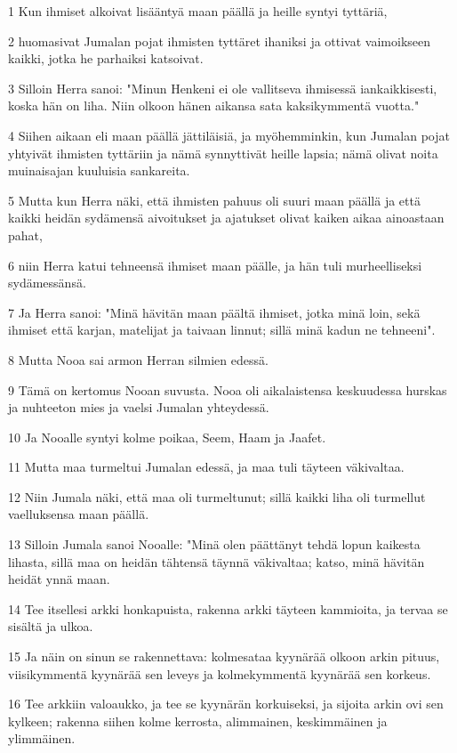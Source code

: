 \par 1 Kun ihmiset alkoivat lisääntyä maan päällä ja heille syntyi tyttäriä,
\par 2 huomasivat Jumalan pojat ihmisten tyttäret ihaniksi ja ottivat vaimoikseen kaikki, jotka he parhaiksi katsoivat.
\par 3 Silloin Herra sanoi: "Minun Henkeni ei ole vallitseva ihmisessä iankaikkisesti, koska hän on liha. Niin olkoon hänen aikansa sata kaksikymmentä vuotta."
\par 4 Siihen aikaan eli maan päällä jättiläisiä, ja myöhemminkin, kun Jumalan pojat yhtyivät ihmisten tyttäriin ja nämä synnyttivät heille lapsia; nämä olivat noita muinaisajan kuuluisia sankareita.
\par 5 Mutta kun Herra näki, että ihmisten pahuus oli suuri maan päällä ja että kaikki heidän sydämensä aivoitukset ja ajatukset olivat kaiken aikaa ainoastaan pahat,
\par 6 niin Herra katui tehneensä ihmiset maan päälle, ja hän tuli murheelliseksi sydämessänsä.
\par 7 Ja Herra sanoi: "Minä hävitän maan päältä ihmiset, jotka minä loin, sekä ihmiset että karjan, matelijat ja taivaan linnut; sillä minä kadun ne tehneeni".
\par 8 Mutta Nooa sai armon Herran silmien edessä.
\par 9 Tämä on kertomus Nooan suvusta. Nooa oli aikalaistensa keskuudessa hurskas ja nuhteeton mies ja vaelsi Jumalan yhteydessä.
\par 10 Ja Nooalle syntyi kolme poikaa, Seem, Haam ja Jaafet.
\par 11 Mutta maa turmeltui Jumalan edessä, ja maa tuli täyteen väkivaltaa.
\par 12 Niin Jumala näki, että maa oli turmeltunut; sillä kaikki liha oli turmellut vaelluksensa maan päällä.
\par 13 Silloin Jumala sanoi Nooalle: "Minä olen päättänyt tehdä lopun kaikesta lihasta, sillä maa on heidän tähtensä täynnä väkivaltaa; katso, minä hävitän heidät ynnä maan.
\par 14 Tee itsellesi arkki honkapuista, rakenna arkki täyteen kammioita, ja tervaa se sisältä ja ulkoa.
\par 15 Ja näin on sinun se rakennettava: kolmesataa kyynärää olkoon arkin pituus, viisikymmentä kyynärää sen leveys ja kolmekymmentä kyynärää sen korkeus.
\par 16 Tee arkkiin valoaukko, ja tee se kyynärän korkuiseksi, ja sijoita arkin ovi sen kylkeen; rakenna siihen kolme kerrosta, alimmainen, keskimmäinen ja ylimmäinen.
